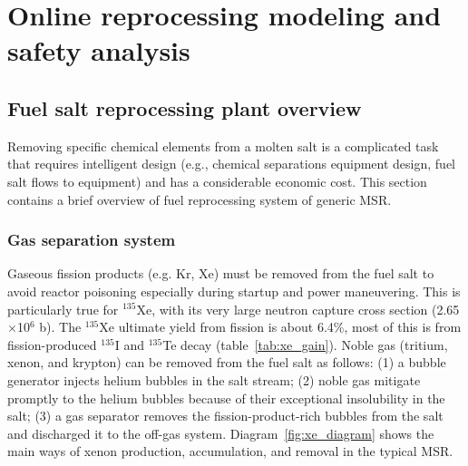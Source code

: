 \chapter[Online reprocessing modeling and safety analysis]{Online reprocessing 
modeling and safety analysis}
\section{Fuel salt reprocessing plant overview}
Removing specific chemical elements from a molten salt is a complicated 
task that requires intelligent design (e.g., chemical separations equipment 
design, fuel salt flows to equipment) and has a considerable economic cost. 
This section contains a brief overview of fuel reprocessing system of generic 
\gls{MSR}.

\subsection{Gas separation system}
Gaseous fission products (e.g. Kr, Xe) must be removed from the fuel salt 
to avoid reactor poisoning especially during startup and power maneuvering. 
This is particularly true for $^{135}$Xe, with its very large neutron capture 
cross section (2.65$\times$10$^6$ b). The $^{135}$Xe ultimate yield from 
fission is about 6.4\%, most of this is from fission-produced $^{135}$I and 
$^{135}$Te decay (table~\ref{tab:xe_gain}). Noble gas (tritium, xenon, and 
krypton) can be removed from the fuel salt as follows: (1) a bubble generator 
injects helium bubbles in the salt stream; (2) noble gas mitigate promptly 
to the helium bubbles because of their exceptional insolubility in the salt; 
(3) a gas separator removes the fission-product-rich bubbles from
the salt 
and discharged it to the off-gas system. Diagram~\ref{fig:xe_diagram} shows 
the main ways of xenon production, accumulation, and removal in the typical 
\gls{MSR}.

